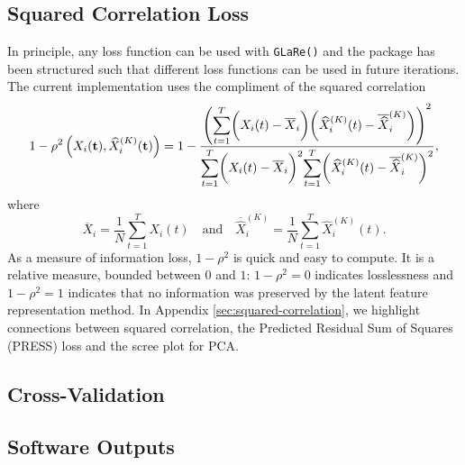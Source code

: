 \subsection{Squared Correlation Loss}

In principle, any loss function can be used with \texttt{GLaRe()} and the package has been structured such that different loss functions can be used in future iterations.
The current implementation uses the compliment of the squared correlation
$$
1- \rho^2 \left(X_i (\mathbf{t}), \widehat{X}^{(K)}_{i} (\mathbf{t}) \right) =
1 - \frac{\left( \mathlarger{\sum}_{t = 1}^T{\bigg(X_i (t) - \overline{X}_i \bigg) \bigg( \widehat{X}_i^{(K)} (t) - \overline{\widehat{X}}_i^{(K)} \bigg)} \right)^2}{\mathlarger{\sum}_{t = 1}^T \bigg(X_i (t) - \overline{X}_i \bigg)^2 \mathlarger{\sum}_{t = 1}^T \bigg( \widehat{X}_i^{(K)} (t) - \overline{\widehat{X}}_i^{(K)} \bigg) ^2},
$$
where
$$
\overline{X}_i = \frac{1}{N} \sum_{t=1}^T X_i (t) \quad \text{and} \quad \overline{\widehat{X}}_i^{(K)} = \frac{1}{N} \sum_{t=1}^T \widehat{X}_i^{(K)} (t).
$$
As a measure of information loss, $1- \rho^2$ is quick and easy to compute.
It is a relative measure, bounded between $0$ and $1$: $1- \rho^2 = 0$ indicates losslessness and $1- \rho^2 = 1$ indicates that no information was preserved by the latent feature representation method.
In Appendix \ref{sec:squared-correlation}, we highlight connections between squared correlation, the Predicted Residual Sum of Squares (PRESS) loss and the scree plot for PCA.

\subsection{Cross-Validation}

\subsection{Software Outputs}

